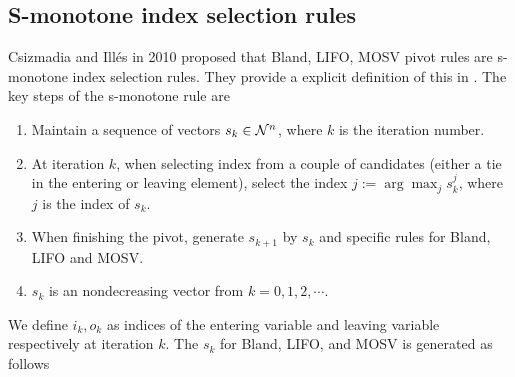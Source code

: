 \documentclass[11pt]{article}
\begin{document}
\subsection{S-monotone index selection rules} \label{secsmono}
Csizmadia and Illés in 2010 \cite{csizmadia2012s} proposed that Bland, LIFO, MOSV pivot rules are s-monotone index selection rules. They provide a explicit definition of this in \cite{csizmadia2012s}. The key steps of the s-monotone rule are
\begin{enumerate}
\item Maintain a sequence of vectors $s_k \in {\cal N}^n$, where $k$ is the iteration number. 
\item At iteration $k$, when selecting index from a couple of candidates (either a tie in the entering or leaving element), select the index $j := \arg \max_j s_k^j$, where $j$ is the index of $s_k$.
\item When finishing the pivot, generate $s_{k+1}$ by $s_{k}$ and specific rules for Bland, LIFO and MOSV. 
\item $s_k$ is an nondecreasing vector from $k=0,1,2,\cdots$.
\end{enumerate}
We define $i_k, o_k$ as indices of the entering variable and leaving variable respectively at iteration $k$. The $s_k$ for Bland, LIFO, and MOSV is generated as follows
\end{document}
